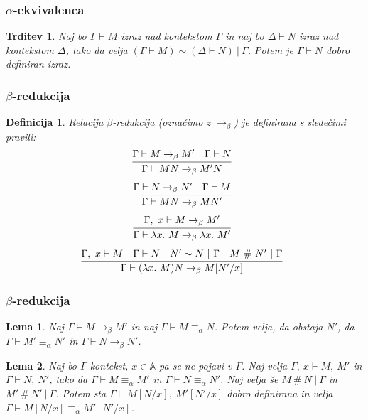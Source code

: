 \documentclass{beamer}
\newcommand{\inference}[3][]{\infer[#1]{#3}{#2}}
\newtheorem{trditev}{Trditev}
\newtheorem{lema}{Lema}
\newtheorem{definicija}{Definicija}
\begin{document}
\begin{frame}[fragile]
\frametitle{\(\alpha\)-ekvivalenca}
\begin{trditev}
    Naj bo \(\Gamma \vdash M\) izraz nad kontekstom \(\Gamma\) in naj bo \(\Delta \vdash N\) izraz nad kontekstom \(\Delta\), tako da velja \((\Gamma \vdash M) \sim (\Delta \vdash N) \ \vert\ \Gamma\). Potem je \(\Gamma \vdash N\) dobro definiran izraz.
\end{trditev}
\end{frame}




\begin{frame}[fragile]
\frametitle{\(\beta\)-redukcija}

\begin{definicija}
    Relacija \(\beta\)-redukcija (označimo z \(\rightarrow_\beta\)) je definirana s sledečimi pravili:
    \[
        \inference{\Gamma \vdash M \rightarrow_\beta M' \quad \Gamma \vdash N}{\Gamma \vdash MN \rightarrow_\beta M'N}
    \]
    \[
        \inference{\Gamma \vdash N \rightarrow_\beta N' \quad \Gamma \vdash M}{\Gamma \vdash MN \rightarrow_\beta MN'}
    \]
    \[
        \inference{\Gamma,\ x \vdash M \rightarrow_\beta M'}{\Gamma \vdash \lambda x.\ M \rightarrow_\beta \lambda x.\ M'}
    \]
    \[
        \inference{\Gamma,\ x \vdash M \quad \Gamma \vdash N \quad N' \sim N \ \vert\ \Gamma \quad M \ \#\ N' \ \vert\ \Gamma}{\Gamma \vdash (\lambda x.\ M)N \rightarrow_\beta M[N'/x]}
    \]
\end{definicija}

\end{frame}


\begin{frame}[fragile]
\frametitle{\(\beta\)-redukcija}

\begin{lema}
    Naj \(\Gamma \vdash M \rightarrow_\beta M'\) in naj
    \(\Gamma \vdash M \equiv_\alpha N\).
    Potem velja, da obstaja \(N'\), da \(\Gamma \vdash M' \equiv_\alpha N' \) in \(\Gamma \vdash N \rightarrow_\beta N'\).
\end{lema}
\pause
\begin{lema}
    Naj bo \(\Gamma\) kontekst, \(x \in \mathds{A}\) pa se ne pojavi v \(\Gamma\). Naj velja \(\Gamma,\ x \vdash M,\ M'\) in \(\Gamma \vdash N,\ N'\), tako da \(\Gamma \vdash M \equiv_\alpha M'\) in \(\Gamma \vdash N \equiv_\alpha N'\). Naj velja še \(M \ \#\ N \ \vert\ \Gamma\) in \(M' \ \#\ N' \ \vert\ \Gamma\). Potem sta \(\Gamma \vdash M[N/x],\ M'[N'/x]\) dobro definirana in velja \(\Gamma \vdash M[N/x] \equiv_\alpha M'[N'/x]\).
\end{lema}


\end{frame}
\end{document}
